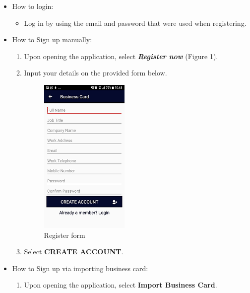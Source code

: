 \documentclass[english]{article}
\begin{document}
	\begin{itemize}
		\item How to login:
		\begin{itemize}
			\item Log in by using the email and password that were used when registering.
		\end{itemize}	
	\end{itemize}


	\begin{itemize}	
		\item How to Sign up manually:
		\begin{enumerate}
			\item Upon opening the application, select \textbf{\textit{Register now}} (Figure 1).
			\item Input your details on the provided form below.
			
			
			\begin{figure}[h!]
				\centering
				\includegraphics[scale=0.7]{Sign_up.png}
				\caption{Register form}
				\label{figure: 2}
			\end{figure}
		
			\item Select \textbf{CREATE ACCOUNT}.
				
			 
		\end{enumerate}
		\item How to Sign up via importing business card:
		\begin{enumerate}
			\item Upon opening the application, select \textbf{Import Business Card}.
			

\end{enumerate}
\end{itemize}
\end{document}
